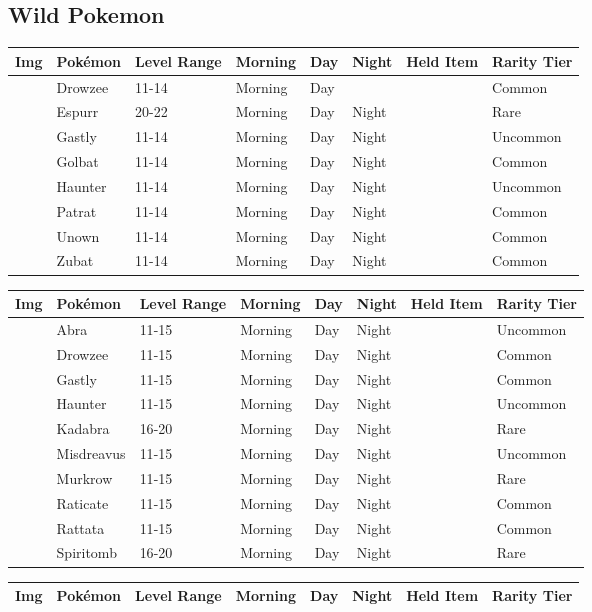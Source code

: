\subsection{Wild Pokemon}%
\label{subsec:WildPokemon}%
\begin{longtable}{||l l l l l l l l||}%
\hline%
Img&Pokémon&Level Range&Morning&Day&Night&Held Item&Rarity Tier\\%
\hline%
\endhead%
\hline%
&Drowzee&11{-}14&Morning&Day&&&Common\\%
\hline%
&Espurr&20{-}22&Morning&Day&Night&&Rare\\%
\hline%
&Gastly&11{-}14&Morning&Day&Night&&Uncommon\\%
\hline%
&Golbat&11{-}14&Morning&Day&Night&&Common\\%
\hline%
&Haunter&11{-}14&Morning&Day&Night&&Uncommon\\%
\hline%
&Patrat&11{-}14&Morning&Day&Night&&Common\\%
\hline%
&Unown&11{-}14&Morning&Day&Night&&Common\\%
\hline%
&Zubat&11{-}14&Morning&Day&Night&&Common\\%
\hline%
\end{longtable}%
\begin{longtable}{||l l l l l l l l||}%
\hline%
Img&Pokémon&Level Range&Morning&Day&Night&Held Item&Rarity Tier\\%
\hline%
\endhead%
\hline%
&Abra&11{-}15&Morning&Day&Night&&Uncommon\\%
\hline%
&Drowzee&11{-}15&Morning&Day&Night&&Common\\%
\hline%
&Gastly&11{-}15&Morning&Day&Night&&Common\\%
\hline%
&Haunter&11{-}15&Morning&Day&Night&&Uncommon\\%
\hline%
&Kadabra&16{-}20&Morning&Day&Night&&Rare\\%
\hline%
&Misdreavus&11{-}15&Morning&Day&Night&&Uncommon\\%
\hline%
&Murkrow&11{-}15&Morning&Day&Night&&Rare\\%
\hline%
&Raticate&11{-}15&Morning&Day&Night&&Common\\%
\hline%
&Rattata&11{-}15&Morning&Day&Night&&Common\\%
\hline%
&Spiritomb&16{-}20&Morning&Day&Night&&Rare\\%
\hline%
\end{longtable}%
\begin{longtable}{||l l l l l l l l||}%
\hline%
Img&Pokémon&Level Range&Morning&Day&Night&Held Item&Rarity Tier\\%
\hline%
\endhead%
\hline%
\end{longtable}%
